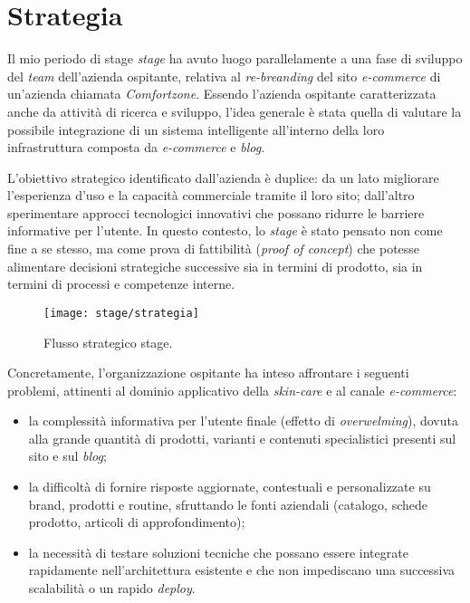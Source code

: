 \section{Strategia}

Il mio periodo di stage \emph{stage} ha avuto luogo parallelamente a una fase di sviluppo del \emph{team} dell'azienda ospitante, relativa al \emph{re-breanding} del sito \emph{e-commerce} 
di un'azienda chiamata \emph{Comfortzone}. Essendo l'azienda ospitante caratterizzata anche da attività di ricerca e sviluppo, l'idea generale è stata quella di 
valutare la possibile integrazione di un sistema intelligente all'interno della loro infrastruttura composta da \emph{e-commerce} e \emph{blog}. 

L'obiettivo strategico identificato dall'azienda è duplice: da un lato migliorare l'esperienza d'uso e la capacità commerciale tramite il loro sito; 
dall'altro sperimentare approcci tecnologici innovativi che possano ridurre le barriere informative per l'utente. 
In questo contesto, lo \emph{stage} è stato pensato non come fine a se stesso, ma come prova di fattibilità (\emph{proof of concept}) che potesse alimentare decisioni strategiche successive 
sia in termini di prodotto, sia in termini di processi e competenze interne.

\begin{figure}[htbp]
  \centering
  \texttt{[image: stage/strategia]}
  \caption{Flusso strategico stage.}
  \label{fig:strategia}
\end{figure}

Concretamente, l'organizzazione ospitante ha inteso affrontare i seguenti problemi, attinenti al dominio applicativo della \emph{skin-care} e al canale \emph{e-commerce}:

\begin{itemize}
  \item la complessità informativa per l'utente finale (effetto di \emph{overwelming}), dovuta alla grande quantità di prodotti, varianti e contenuti specialistici presenti sul sito e sul \emph{blog};
  \item la difficoltà di fornire risposte aggiornate, contestuali e personalizzate su brand, prodotti e routine, sfruttando le fonti aziendali (catalogo, schede prodotto, articoli di approfondimento);
  \item la necessità di testare soluzioni tecniche che possano essere integrate rapidamente nell'architettura esistente e che non impediscano una successiva scalabilità o un rapido \emph{deploy}.
\end{itemize}

